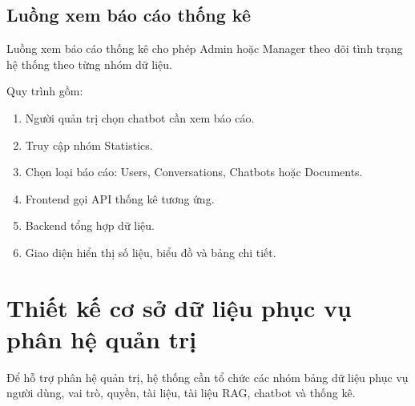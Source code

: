 \documentclass[12pt,a4paper]{report}
\begin{document}
\subsection{Luồng xem báo cáo thống kê}

Luồng xem báo cáo thống kê cho phép Admin hoặc Manager theo dõi tình trạng hệ thống theo từng nhóm dữ liệu.

Quy trình gồm:

\begin{enumerate}
    \item Người quản trị chọn chatbot cần xem báo cáo.
    \item Truy cập nhóm Statistics.
    \item Chọn loại báo cáo: Users, Conversations, Chatbots hoặc Documents.
    \item Frontend gọi API thống kê tương ứng.
    \item Backend tổng hợp dữ liệu.
    \item Giao diện hiển thị số liệu, biểu đồ và bảng chi tiết.
\end{enumerate}

\section{Thiết kế cơ sở dữ liệu phục vụ phân hệ quản trị}

Để hỗ trợ phân hệ quản trị, hệ thống cần tổ chức các nhóm bảng dữ liệu phục vụ người dùng, vai trò, quyền, tài liệu, tài liệu RAG, chatbot và thống kê.
\end{document}

